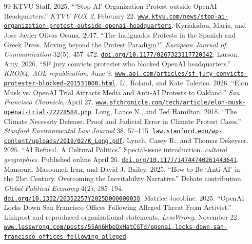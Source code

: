 \documentclass[11pt]{article}
\begin{document}
\begin{thebibliography}{99}
 KTVU Staff. 2025. ```Stop AI' Organization Protest outside OpenAI Headquarters.'' \emph{KTVU FOX 2}, February 22. \href{https://www.ktvu.com/news/stop-ai-organization-protest-outside-openai-headquarters}{\nolinkurl{www.ktvu.com/news/stop-ai-organization-protest-outside-openai-headquarters}}.
 Kyriakidou, Maria, and Jose Javier Olivas Osuna. 2017. ``The Indignados Protests in the Spanish and Greek Press. Moving beyond the Protest Paradigm?'' \emph{European Journal of Communication} 32(5), 457--472. \href{https://doi.org/10.1177/0267323117720342}{\nolinkurl{doi.org/10.1177/0267323117720342}}.
 Larson, Amy. 2026. ``SF jury convicts protester who blocked OpenAI headquarters.'' \emph{KRON4, AOL republication}, June 9. \href{https://www.aol.com/articles/sf-jury-convicts-protester-blocked-201531000.html}{\nolinkurl{www.aol.com/articles/sf-jury-convicts-protester-blocked-201531000.html}}.
 Li, Roland, and Kate Talerico. 2026. ``Elon Musk vs. OpenAI Trial Attracts Media and Anti-AI Protests to Oakland.'' \emph{San Francisco Chronicle}, April 27. \href{https://www.sfchronicle.com/tech/article/elon-musk-openai-trial-22228584.php}{\nolinkurl{www.sfchronicle.com/tech/article/elon-musk-openai-trial-22228584.php}}.
 Long, Lance N., and Ted Hamilton. 2018. ``The Climate Necessity Defense. Proof and Judicial Error in Climate Protest Cases.'' \emph{Stanford Environmental Law Journal} 38, 57--115. \href{https://law.stanford.edu/wp-content/uploads/2019/02/K_Long.pdf}{\nolinkurl{law.stanford.edu/wp-content/uploads/2019/02/K_Long.pdf}}.
 Lynch, Casey R., and Thomas Dekeyser. 2026. ``AI Refusal.  A Cultural Politics.'' Special-issue introduction. \emph{cultural geographies}. Published online April 26. \href{https://doi.org/10.1177/14744740261443641}{\nolinkurl{doi.org/10.1177/14744740261443641}}.
 Mansouri, Masoumeh Iran, and David J. Bailey. 2025. ``How to Be `Anti-AI' in the 21st Century.  Overcoming the Inevitability Narrative.'' Debate contribution. \emph{Global Political Economy} 4(2), 185--194. \href{https://doi.org/10.1332/26352257Y2025D000000030}{\nolinkurl{doi.org/10.1332/26352257Y2025D000000030}}.
 Matrice Jacobine. 2025. ``OpenAI Locks Down San Francisco Offices Following Alleged Threat From Activist.'' Linkpost and reproduced organizational statements. \emph{LessWrong}, November 22. \href{https://www.lesswrong.com/posts/5SAn6HbeQxHatCGTd/openai-locks-down-san-francisco-offices-following-alleged}{\nolinkurl{www.lesswrong.com/posts/5SAn6HbeQxHatCGTd/openai-locks-down-san-francisco-offices-following-alleged}}.

\end{thebibliography}
\end{document}
